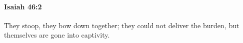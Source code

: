 
		\paragraph{Isaiah 46:2} %
			\label{ISAIAH-46-2}

			They stoop, they bow down together; they could not deliver the burden, but themselves are gone into captivity.


